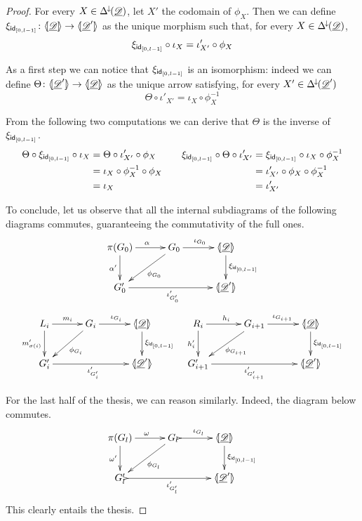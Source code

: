 \begin{proof}
	For every $X\in \Delta^{\hspace{-1pt}\downarrow\hspace{-1pt}}(\underline{\mathscr{D}}) $, let $X'$ the codomain of $\phi_X$. Then we can define $\xi_{\mathsf{id}_{[0,l-1]}}\colon \langle \hspace{-1.85pt}[ \underline{\mathscr{D}}]\hspace{-1.85pt}\rangle\to \langle \hspace{-1.85pt}[ \underline{\mathscr{D}}']\hspace{-1.85pt}\rangle$ as the unique morphism such that, for every $X\in \Delta^{\hspace{-1pt}\downarrow\hspace{-1pt}}(\underline{\mathscr{D}})$, 
	\[\xi_{\mathsf{id}_{[0,l-1]}} \circ \iota_{X}= \iota'_{X'}\circ \phi_X\]

As a first step we can notice that $\xi_{\mathsf{id}_{[0,l-1]}}$ is an isomorphism: indeed we can define $\Theta\colon \langle \hspace{-1.85pt}[\underline{\mathscr{D}}']\hspace{-1.85pt}\rangle \to \langle \hspace{-1.85pt}[ \underline{\mathscr{D}}]\hspace{-1.85pt}\rangle$ as the unique arrow satisfying, for every $X'\in \Delta^{\hspace{-1pt}\downarrow\hspace{-1pt}}(\underline{\mathscr{D}}')$
\[\Theta \circ \iota'_{X'}= \iota_{X}\circ \phi^{-1}_X\]

From the following two computations we can derive that $\Theta$ is the inverse of $\xi_{\mathsf{id}_{[0,l-1]}}$.
\[\begin{split}
	\Theta \circ \xi_{\mathsf{id}_{[0,l-1]}}\circ \iota_{X}&=\Theta \circ\iota'_{X'}\circ \phi_X\\&=\iota_{X}\circ \phi^{-1}_X\circ \phi_X\\&=\iota_X 
\end{split}\qquad \begin{split}
\xi_{\mathsf{id}_{[0,l-1]}}\circ \Theta \circ \iota'_{X'}&=\xi_{\mathsf{id}_{[0,l-1]}}\circ \iota_X\circ \phi^{-1}_{X}\\&=\iota'_{X'}\circ \phi_X\circ \phi^{-1}_{X}\\&=\iota'_{X'}
\end{split}\]

To conclude, let us observe that all the internal subdiagrams of the following diagrams commutes, guaranteeing the commutativity of the full ones.
\[\xymatrix@C=30pt{\pi(G_0)\ar[r]^{\alpha} \ar[d]_{\alpha'} & G_0 \ar[dl]^{\phi_{G_0}} \ar[r]^{\iota_{G_0}} &\tpro{D} \ar[d]^{\xi_{\id{[0, l-1]}}}\\ G'_0 \ar[rr]_{\iota'_{G'_0}} & &\lpro \der{D}' \rpro}\]
\[\xymatrix@C=30pt{L_i \ar[r]^{m_i} \ar[d]_{m'_{\sigma(i)}}& G_i \ar[dl]^{\phi_{G_i}} \ar[r]^{\iota_{G_i}} &\tpro{D} \ar[d]^{\xi_{\id{[0, l-1]}}} & R_i \ar[r]^{h_i} \ar[d]_{h'_{i}}& G_{i+1} \ar[dl]^{\phi_{G_{i+1}}}\ar[r]^{\iota_{G_{i+1}}} &\tpro{D} \ar[d]^{\xi_{\id{[0, l-1]}}} \\G'_{i} \ar[rr]_{\iota'_{G'_{i}}}&& \lpro \der{D}' \rpro& G'_{i+1} \ar[rr]_{\iota'_{G'_{i+1}}}&& \lpro \der{D}' \rpro}\]

For the last half of the thesis, we can reason similarly. Indeed, the diagram below commutes.
\[\xymatrix@C=30pt{\pi(G_l)\ar[r]^{\omega} \ar[d]_{\omega'} & G_l \ar[dl]^{\phi_{G_l}} \ar@{>->}[r]^{\iota_{G_l}} &\tpro{D} \ar[d]^{\xi_{\id{[0, l-1]}}}\\ G'_l \ar@{>->}[rr]_{\iota'_{G'_l}} & &\lpro \der{D}' \rpro}\]
This clearly entails the thesis.
\end{proof}

